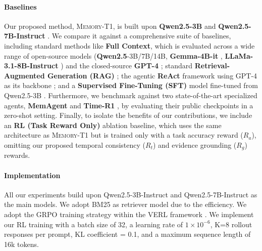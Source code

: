 \documentclass{article} %
\begin{document}
\paragraph{Baselines}
Our proposed method, \textsc{Memory-T1}, is built upon \textbf{Qwen2.5-3B} and \textbf{Qwen2.5-7B-Instruct} \citep{qwen2.5}. We compare it against a comprehensive suite of baselines, including standard methods like \textbf{Full Context}, which is evaluated across a wide range of open-source models (\textbf{Qwen2.5}-3B/7B/14B, \textbf{Gemma-4B-it} \citep{gemma_2025}, \textbf{LLaMa-3.1-8B-Instruct} \citep{dubey2024llama}) and the closed-source \textbf{GPT-4} \citep{achiam2023gpt}; standard \textbf{Retrieval-Augmented Generation (RAG)} \citep{lewis2020retrieval}; the agentic \textbf{ReAct} framework using GPT-4 as its backbone \citep{yao2023react}; and a \textbf{Supervised Fine-Tuning (SFT)} model fine-tuned from Qwen2.5-3B \citep{ouyang2022training}. Furthermore, we benchmark against two state-of-the-art specialized agents, \textbf{MemAgent} \citep{yu2025memagent} and \textbf{Time-R1} \citep{liu2025time}, by evaluating their public checkpoints in a zero-shot setting. Finally, to isolate the benefits of our contributions, we include an \textbf{RL (Task Reward Only)} ablation baseline, which uses the same architecture as \textsc{Memory-T1} but is trained only with a task accuracy reward ($R_a$), omitting our proposed temporal consistency ($R_t$) and evidence grounding ($R_g$) rewards.

\paragraph{Implementation} All our experiments build upon Qwen2.5-3B-Instruct and Qwen2.5-7B-Instruct as the main models. We adopt BM25 as retriever model due to the efficiency. We adopt the GRPO training strategy within the VERL framework \citep{sheng2024hybridflow}. We implement our RL training with a batch size of 32, a learning rate of $1 \times 10^{-6}$, K=8 rollout responses per prompt, KL coefficient = 0.1, and a maximum sequence length of 16k tokens.
\end{document}
